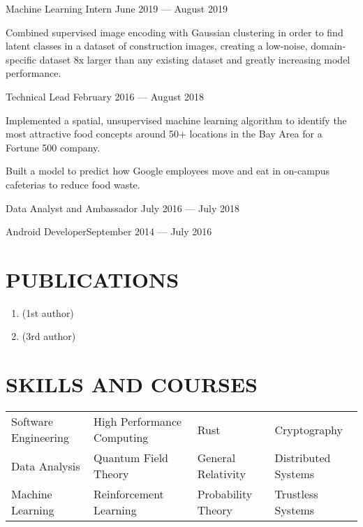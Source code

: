 \documentclass[10pt]{article}
\begin{document}
                {Machine Learning Intern}
                {June 2019 --- August 2019}
                    \begin{accomplishments}
                        \item Combined supervised image encoding with Gaussian clustering in order to find latent classes in a dataset of construction images, creating a low-noise, domain-specific dataset 8x larger than any existing dataset and greatly increasing model performance.
                    \end{accomplishments}

								{Technical Lead}
								{February 2016 --- August 2018}                  		
	                   \begin{accomplishments} 
	                    		\item Implemented a spatial, unsupervised machine learning algorithm to identify the most attractive food concepts around 50+ locations in the Bay Area for a Fortune 500 company.
                          \item Built a model to predict how Google employees move and eat in on-campus cafeterias to reduce food waste.
	                    \end{accomplishments}
	                    		
	   		
	   			{Data Analyst and Ambassador}
	   			{July 2016 --- July 2018}
        \vspace{0.5em}
                  	 
          {Android Developer}{September 2014 --- July 2016}
        \vspace{0.5em}
                  

\section*{PUBLICATIONS}

\begin{enumerate}
  \item {} (1st author)
  \item {} (3rd author)
\end{enumerate}

\vspace{-0.6em}
\section*{SKILLS AND COURSES}
				\setlength{\columnsep}{.5pt}
				\begin{tabu}{X[2c]X[2.5c]X[2c]X[2c]}
					Software Engineering & High Performance Computing & Rust                 & Cryptography \\
					Data Analysis 			 & Quantum Field Theory & General Relativity   & Distributed Systems \\
         Machine Learning		 & Reinforcement Learning     & Probability Theory   & Trustless Systems \\
				\end{tabu}
 
\end{document}
